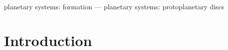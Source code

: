 \documentclass[useAMS,usenatbib]{mn2e}
\begin{document}
\begin{keywords}
  planetary systems: formation --- planetary systems:
  protoplanetary discs
\end{keywords}


\section{Introduction}\label{intro}












\appendix

%
\end{document}

